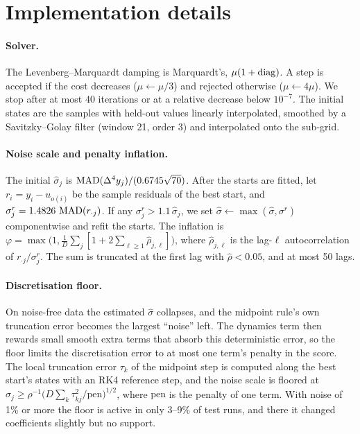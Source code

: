 \section{Implementation details}
\label{app:impl}

\paragraph{Solver.} The Levenberg--Marquardt damping is Marquardt's, $\mu(1+\operatorname{diag})$. A step is accepted if the cost decreases ($\mu\leftarrow\mu/3$) and rejected otherwise ($\mu\leftarrow 4\mu$). We stop after at most 40 iterations or at a relative decrease below $10^{-7}$. The initial states are the samples with held-out values linearly interpolated, smoothed by a Savitzky--Golay filter (window 21, order 3) and interpolated onto the sub-grid.

\paragraph{Noise scale and penalty inflation.} The initial $\hat\sigma_j$ is $\operatorname{MAD}(\Delta^4 y_j)/(0.6745\sqrt{70})$. After the starts are fitted, let $r_i=y_i-u_{o(i)}$ be the sample residuals of the best start, and $\sigma^{r}_j = 1.4826\,\operatorname{MAD}(r_{\cdot j})$. If any $\sigma^r_j>1.1\,\hat\sigma_j$, we set $\hat\sigma\leftarrow\max(\hat\sigma,\sigma^r)$ componentwise and refit the starts. The inflation is $\varphi=\max\bigl(1, \tfrac1D\sum_j[1+2\sum_{\ell\ge1}\hat\rho_{j,\ell}]\bigr)$, where $\hat\rho_{j,\ell}$ is the lag-$\ell$ autocorrelation of $r_{\cdot j}/\sigma^r_j$. The sum is truncated at the first lag with $\hat\rho<0.05$, and at most 50 lags.

\paragraph{Discretisation floor.} On noise-free data the estimated $\hat\sigma$ collapses, and the midpoint rule's own truncation error becomes the largest ``noise'' left. The dynamics term then rewards small smooth extra terms that absorb this deterministic error, so the floor limits the discretisation error to at most one term's penalty in the score. The local truncation error $\tau_k$ of the midpoint step is computed along the best start's states with an RK4 reference step, and the noise scale is floored at $\sigma_j\ge\rho^{-1}\bigl(D\sum_k\tau_{kj}^2/\mathrm{pen}\bigr)^{1/2}$, where $\mathrm{pen}$ is the penalty of one term. With noise of 1\% or more the floor is active in only 3--9\% of test runs, and there it changed coefficients slightly but no support.

